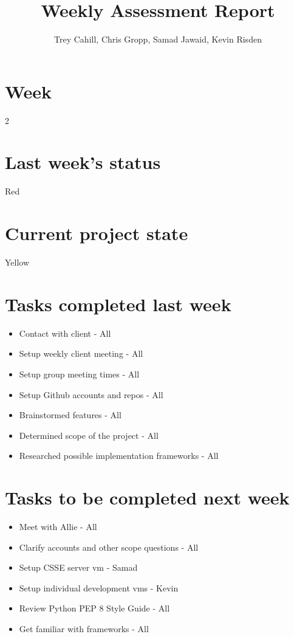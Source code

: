 \documentclass{article}
\title{Weekly Assessment Report}
\author{Trey Cahill, Chris Gropp, Samad Jawaid, Kevin Risden}
\begin{document}
\maketitle
\section{Week}
2
\section{Last week's status}
Red
\section{Current project state}
Yellow
\section{Tasks completed last week}
\begin{itemize}
\item Contact with client - All
\item Setup weekly client meeting - All
\item Setup group meeting times - All
\item Setup Github accounts and repos - All
\item Brainstormed features - All
\item Determined scope of the project - All
\item Researched possible implementation frameworks - All
\end{itemize}
\section{Tasks to be completed next week}
\begin{itemize}
\item Meet with Allie - All
\item Clarify accounts and other scope questions - All
\item Setup CSSE server vm - Samad
\item Setup individual development vms - Kevin
\item Review Python PEP 8 Style Guide - All
\item Get familiar with frameworks - All
\end{itemize}
\end{document}

